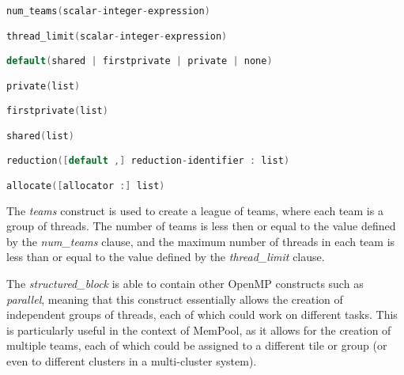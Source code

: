 \begin{lstlisting}[language=C, caption={teams clauses}, label={lst:teams-clauses}]
num_teams(scalar-integer-expression)

thread_limit(scalar-integer-expression)

default(shared | firstprivate | private | none)

private(list)

firstprivate(list)

shared(list)

reduction([default ,] reduction-identifier : list)

allocate([allocator :] list)
\end{lstlisting}

The \emph{teams} construct is used to create a league of teams, where each team is a group of
threads. The number of teams is less then or equal to the value defined by the \emph{num\_teams}
clause, and the maximum number of threads in each team is less than or equal to the value defined by
the \emph{thread\_limit} clause.

The \emph{structured_block} is able to contain other OpenMP constructs such as \emph{parallel},
meaning that this construct essentially allows the creation of independent groups of threads, each
of which could work on different tasks. This is particularly useful in the context of MemPool, as
it allows for the creation of multiple teams, each of which could be assigned to a different tile or
group (or even to different clusters in a multi-cluster system).
